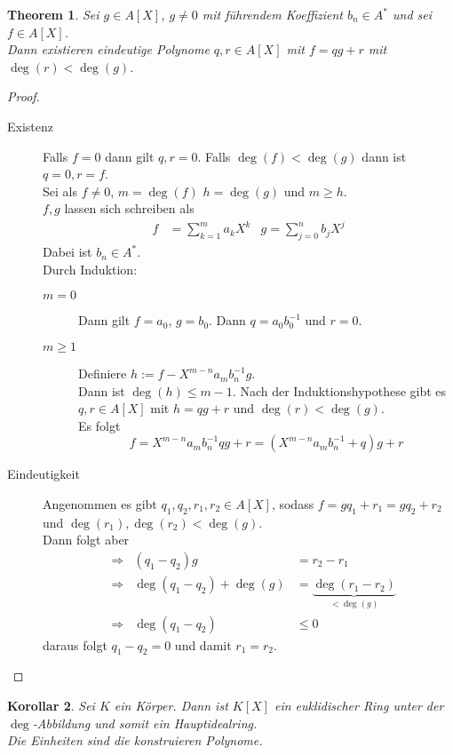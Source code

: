 \documentclass[10pt,a4paper]{article}
\theoremstyle{plain}
\newtheorem{theorem}{Theorem}[section]
\newtheorem{kor}[theorem]{Korollar}
\theoremstyle{definition}
\theoremstyle{remark}
\begin{document}
	\begin{theorem}
		Sei $g\in A[X]$, $g\neq 0$ mit führendem Koeffizient $b_n\in A^*$ und sei $f\in A[X]$.\\
		Dann existieren eindeutige Polynome $q,r\in A[X]$ mit $f=qg+r$ mit $\deg(r)<\deg(g)$.
	\end{theorem}
	\begin{proof}
		\begin{description}
			\item[Existenz] Falls $f=0$ dann gilt $q,r=0$. Falls $\deg(f)<\deg(g)$ dann ist $q=0,r=f$.\\
			Sei als $f\neq 0$, $m=\deg(f)$ $h=\deg(g)$ und $m\geq h$.\\
			$f,g$ lassen sich schreiben als
			\begin{align*}
			f&=\sum_{k=1}^{m}a_kX^k& g=\sum_{j=0}^{n}b_jX^j
			\end{align*}
			Dabei ist $b_n\in A^*$.\\
			Durch Induktion:
			\begin{description}
				\item[$m=0$] Dann gilt $f=a_0$, $g=b_0$. Dann $q=a_0b_0^{-1}$ und $r=0$.
				\item[$m\geq 1$] Definiere $h:=f-X^{m-n}a_mb_n^{-1}g$.\\
				Dann ist $\deg(h)\leq m-1$. Nach der Induktionshypothese gibt es $q,r\in A[X]$ mit $h=qg+r$ und $\deg(r)<\deg(g)$.\\
				Es folgt
				\[f=X^{m-n}a_mb_n^{-1}qg+r=(X^{m-n}a_mb_n^{-1}+q)g+r\]
			\end{description}
			\item[Eindeutigkeit] Angenommen es gibt $q_1,q_2,r_1,r_2\in A[X]$, sodass $f=gq_1+r_1=gq_2+r_2$ und $\deg(r_1),\deg(r_2)<\deg(g)$.\\
			Dann folgt aber
			\begin{align*}
			&\Rightarrow&(q_1-q_2)g&=r_2-r_1\\
			&\Rightarrow&\deg(q_1-q_2)+\deg(g)&=\underbrace{\deg(r_1-r_2)}_{<\deg(g)}\\
			&\Rightarrow&\deg(q_1-q_2)&\leq 0
			\end{align*}
			daraus folgt $q_1-q_2=0$ und damit $r_1=r_2$.
		\end{description}
	\end{proof}

	\begin{kor}
		Sei $K$ ein Körper. Dann ist $K[X]$ ein euklidischer Ring unter der $\deg$-Abbildung und somit ein Hauptidealring.\\
		Die Einheiten sind die konstruieren Polynome.
	\end{kor}
\end{document}
